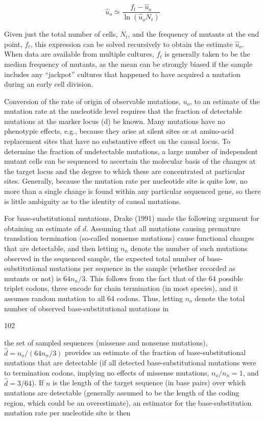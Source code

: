 \documentclass{article}
\begin{document}
\begin{equation}
\widehat{u}_{o}\simeq\frac{f_{t}-\widehat{u}_{o}}{\ln(\widehat{u}_{o}N_{t})}
\tag{4.22d}
\label{eq:4_22d}
\end{equation}

Given just the total number of cells,  $ N_t $, and the frequency of mutants at the end point,  $ f_t $, this expression can be solved recursively to obtain the estimate  $ \widehat{u}_o $. When data are available from multiple cultures,  $ f_t $ is generally taken to be the median frequency of mutants, as the mean can be strongly biased if the sample includes any “jackpot” cultures that happened to have acquired a mutation during an early cell division.

Conversion of the rate of origin of observable mutations,  $ u_{o} $, to an estimate of the mutation rate at the nucleotide level requires that the fraction of detectable mutations at the marker locus (d) be known. Many mutations have no phenotypic effects, e.g., because they arise at silent sites or at amino-acid replacement sites that have no substantive effect on the causal locus. To determine the fraction of undetectable mutations, a large number of independent mutant cells can be sequenced to ascertain the molecular basis of the changes at the target locus and the degree to which these are concentrated at particular sites. Generally, because the mutation rate per nucleotide site is quite low, no more than a single change is found within any particular sequenced gene, so there is little ambiguity as to the identity of causal mutations.

For base-substitutional mutations, Drake (1991) made the following argument for obtaining an estimate of  $ d $. Assuming that all mutations causing premature translation termination (so-called nonsense mutations) cause functional changes that are detectable, and then letting  $ n_n $ denote the number of such mutations observed in the sequenced sample, the expected total number of base-substitutional mutations per sequence in the sample (whether recorded as mutants or not) is  $ 64n_n/3 $. This follows from the fact that of the 64 possible triplet codons, three encode for chain termination (in most species), and it assumes random mutation to all 64 codons. Thus, letting  $ n_o $ denote the total number of observed base-substitutional mutations in

102

the set of sampled sequences (missense and nonsense mutations),  $ \hat{d} = n_o / (64n_n / 3) $ provides an estimate of the fraction of base-substitutional mutations that are detectable (if all detected base-substitutional mutations were to termination codons, implying no effects of missense mutations,  $ n_o / n_n = 1 $, and  $ \hat{d} = 3 / 64 $). If  $ n $ is the length of the target sequence (in base pairs) over which mutations are detectable (generally assumed to be the length of the coding region, which could be an overestimate), an estimator for the base-substitution mutation rate per nucleotide site is then
\end{document}
